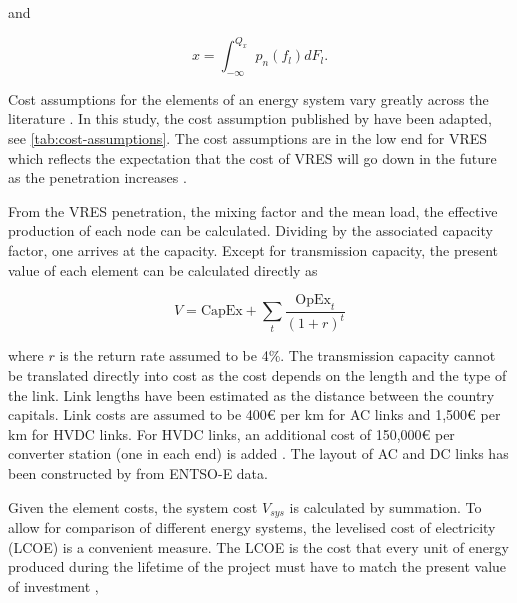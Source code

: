 \documentclass[a4paper, 12pt, sort&compress]{elsarticle}%
\newcommand{\paren}[1]{\left(#1\right)}
\begin{document}
and 

\begin{equation}
  \label{eq:4}
  x = \int_{-\infty}^{Q_{x}} p_{n}(f_{l}) dF_{l} .
\end{equation}

Cost assumptions for the elements of an energy system vary greatly
across the literature \cite{Sensitivity}. In this study, the cost assumption published by
\cite{Rolando} have been adapted, see \cref{tab:cost-assumptions}. The cost
assumptions are in the low end for VRES which reflects the expectation
that the cost of VRES will go down in the future as the penetration
increases \cite{Fraunhofer}.



From the VRES penetration, the mixing factor and the mean load, the
effective production of each node can be calculated. Dividing by the
associated capacity factor, one arrives at the capacity. Except for
transmission capacity, the present value of each element can be
calculated directly as

\begin{equation}
  \label{eq:6}
  V = \text{CapEx} + \sum_{t} \frac{\text{OpEx}_{t}}{\paren{1 + r}^{t}}
\end{equation}

where $r$ is the return rate assumed to be 4\%. The transmission
capacity cannot be translated directly into cost as the cost depends
on the length and the type of the link. Link lengths have been
estimated as the distance between the country capitals. Link costs are
assumed to be 400\euro{}
per km for AC links and 1,500\euro{}
per km for HVDC links. For HVDC links, an additional cost of
150,000\euro{}
per converter station (one in each end) is
added \cite{McKinsey, Schaber, Schaber2}. The layout of AC and
DC links has been constructed by \cite{rolando2014} from ENTSO-E data.


Given the element costs, the system cost $V_{sys}$ is calculated by
summation. To allow for comparison of different energy systems, the
levelised cost of electricity (LCOE) is a convenient measure. The LCOE
is the cost that every unit of energy produced during the lifetime of
the project must have to match the present value of
investment \cite{Short1995},
\end{document}
